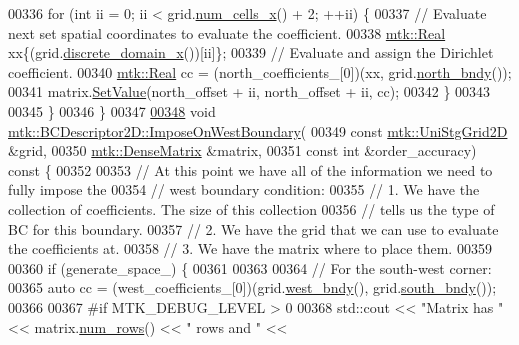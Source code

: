 \begin{DoxyCode}
00336     \textcolor{keywordflow}{for} (\textcolor{keywordtype}{int} ii = 0; ii < grid.\hyperlink{classmtk_1_1UniStgGrid2D_a2d182866a398aba8e4829590e85bf939}{num\_cells\_x}() + 2; ++ii) \{
00337       \textcolor{comment}{// Evaluate next set spatial coordinates to evaluate the coefficient.}
00338       \hyperlink{group__c01-roots_gac080bbbf5cbb5502c9f00405f894857d}{mtk::Real} xx\{(grid.\hyperlink{classmtk_1_1UniStgGrid2D_ab2f70cf5cd0a2d5486992d9f2f8baa4a}{discrete\_domain\_x}())[ii]\};
00339       \textcolor{comment}{// Evaluate and assign the Dirichlet coefficient.}
00340       \hyperlink{group__c01-roots_gac080bbbf5cbb5502c9f00405f894857d}{mtk::Real} cc = (north\_coefficients\_[0])(xx, grid.\hyperlink{classmtk_1_1UniStgGrid2D_afe1ead253cdeb5503e0489eba8fd84e2}{north\_bndy}());
00341       matrix.\hyperlink{classmtk_1_1DenseMatrix_a784ce5784109ac86bfb9d8562b334b13}{SetValue}(north\_offset + ii, north\_offset + ii, cc);
00342     \}
00343 
00345   \}
00346 \}
00347 
\hypertarget{mtk__bc__descriptor__2d_8cc_source_l00348}{}\hyperlink{classmtk_1_1BCDescriptor2D_a0e7bc4d22fa8c9b9a29dd71669b35744}{00348} \textcolor{keywordtype}{void} \hyperlink{classmtk_1_1BCDescriptor2D_a0e7bc4d22fa8c9b9a29dd71669b35744}{mtk::BCDescriptor2D::ImposeOnWestBoundary}(
00349     \textcolor{keyword}{const} \hyperlink{classmtk_1_1UniStgGrid2D}{mtk::UniStgGrid2D} &grid,
00350     \hyperlink{classmtk_1_1DenseMatrix}{mtk::DenseMatrix} &matrix,
00351     \textcolor{keyword}{const} \textcolor{keywordtype}{int} &order\_accuracy)\textcolor{keyword}{ const }\{
00352 
00353   \textcolor{comment}{// At this point we have all of the information we need to fully impose the}
00354   \textcolor{comment}{// west boundary condition:}
00355   \textcolor{comment}{// 1. We have the collection of coefficients. The size of this collection}
00356   \textcolor{comment}{// tells us the type of BC for this boundary.}
00357   \textcolor{comment}{// 2. We have the grid that we can use to evaluate the coefficients at.}
00358   \textcolor{comment}{// 3. We have the matrix where to place them.}
00359 
00360   \textcolor{keywordflow}{if} (generate\_space\_) \{
00361 
00363 
00364     \textcolor{comment}{// For the south-west corner:}
00365     \textcolor{keyword}{auto} cc = (west\_coefficients\_[0])(grid.\hyperlink{classmtk_1_1UniStgGrid2D_af2b1712387ded85edaf2b64617d3fc13}{west\_bndy}(), grid.\hyperlink{classmtk_1_1UniStgGrid2D_a1442eaf219f099d0ebf46a170fdebf92}{south\_bndy}());
00366 
00367 \textcolor{preprocessor}{    #if MTK\_DEBUG\_LEVEL > 0}
00368     std::cout << \textcolor{stringliteral}{"Matrix has "} << matrix.\hyperlink{classmtk_1_1DenseMatrix_a53f3afb3b6a8d21854458aaa9663cc74}{num\_rows}() << \textcolor{stringliteral}{" rows and "} <<

\end{DoxyCode}
